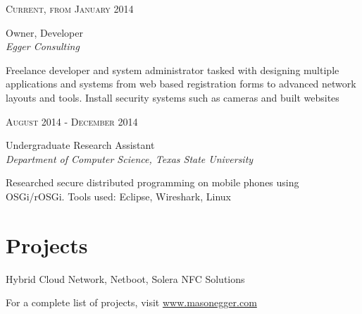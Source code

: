 \documentclass[10pt]{article} %
\begin{document}
\begin{minipage}[t]{0.5\textwidth}

{\raggedleft\textsc{Current, from January 2014}\par}

{\raggedright\large Owner, Developer\\
\textit{Egger Consulting}\\[5pt]}

\normalsize{Freelance developer and system administrator tasked with designing multiple applications and systems from web based registration forms to advanced network layouts and tools. Install security systems such as cameras and built websites}\\




{\raggedleft\textsc{August 2014 - December 2014}\par}

{\raggedright\large Undergraduate Research Assistant\\
\textit{Department of Computer Science, Texas State University}\\[5pt]}

\normalsize{Researched secure distributed programming on mobile phones using OSGi/rOSGi. Tools used: Eclipse, Wireshark, Linux}\\


\section{Projects}

{\raggedright\large Hybrid Cloud Network, Netboot, Solera NFC Solutions\\}

\normalsize{For a complete list of projects, visit \href{http://www.masonegger.com}{www.masonegger.com}}\\

\end{minipage} %
\hfill
\end{document}
